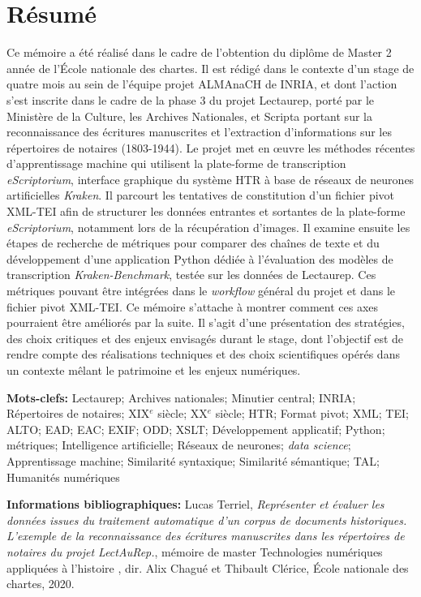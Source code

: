 \chapter*{Résumé}
Ce mémoire a été réalisé dans le cadre de l'obtention du diplôme de Master 2 année  de l'École nationale des chartes. 
Il est rédigé dans le contexte d'un stage de quatre mois au sein de l'équipe projet ALMAnaCH de INRIA, et dont l'action s'est inscrite dans le cadre de la phase 3 du projet Lectaurep, porté par le Ministère de la Culture, les Archives Nationales, et Scripta portant sur la reconnaissance des écritures manuscrites et l'extraction d'informations sur les répertoires de notaires (1803-1944). Le projet met en \oe{}uvre les méthodes récentes d'apprentissage machine qui utilisent la plate-forme de transcription \textit{eScriptorium}, interface graphique du système HTR à base de réseaux de neurones artificielles \textit{Kraken}. Il parcourt les tentatives de constitution d'un fichier pivot XML-TEI afin de structurer les données entrantes et sortantes de la plate-forme \textit{eScriptorium}, notamment lors de la récupération d'images. Il examine ensuite les étapes de recherche de métriques pour comparer des chaînes de texte et du développement d'une application Python dédiée à l'évaluation des modèles de transcription \textit{Kraken-Benchmark}, testée sur les données de Lectaurep. Ces métriques pouvant être intégrées dans le \textit{workflow} général du projet et dans le fichier pivot XML-TEI. Ce mémoire s'attache à montrer comment ces axes pourraient être améliorés par la suite. Il s'agit d'une présentation des stratégies, des choix critiques et des enjeux envisagés durant le stage, dont l'objectif est de rendre compte des réalisations techniques et des choix scientifiques opérés dans un contexte mêlant le patrimoine et les enjeux numériques. 

\bigskip
\textbf{Mots-clefs:} Lectaurep; Archives nationales; Minutier central; INRIA; Répertoires de notaires; XIX$^{e}$ siècle; XX$^{e}$ siècle; HTR; Format pivot; XML; TEI; ALTO; EAD; EAC; EXIF; ODD; XSLT; Développement applicatif; Python; métriques; Intelligence artificielle; Réseaux de neurones; \textit{data science}; Apprentissage machine; Similarité syntaxique; Similarité sémantique; TAL; Humanités numériques

\bigskip
\textbf{Informations bibliographiques:} Lucas Terriel, \textit{Représenter et évaluer les données issues du traitement automatique d'un corpus de documents historiques. L'exemple de la reconnaissance des écritures manuscrites dans les répertoires de notaires du projet LectAuRep.}, mémoire de master \og Technologies numériques appliquées à l'histoire \fg{}, dir. Alix Chagué et Thibault Clérice, École nationale des chartes, 2020.

\clearpage
\thispagestyle{empty}
\cleardoublepage